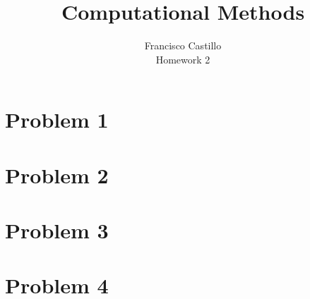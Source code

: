 \documentclass[12pt]{article}
\begin{document}
 
 
 
\title{Computational Methods}%
\author{Francisco Castillo\\Homework 2} %
 
\maketitle
\section*{Problem 1}

\section*{Problem 2}

\newpage
\section*{Problem 3}

\newpage
\section*{Problem 4}



\end{document}
